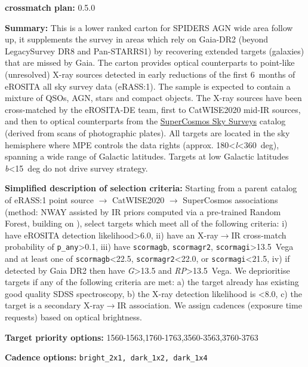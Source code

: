 \noindent\textbf{crossmatch plan:} 0.5.0

\noindent\textbf{Summary:} This is a lower ranked carton for SPIDERS AGN wide
area follow up, it supplements the survey in areas which rely on
Gaia-DR2 (beyond LegacySurvey DR8 and Pan-STARRS1) by recovering
extended targets (galaxies) that are missed by Gaia. The carton provides
optical counterparts to point-like (unresolved) X-ray sources detected
in early reductions of the first 6~months of eROSITA all sky survey data
(eRASS:1). The sample is expected to contain a mixture of QSOs, AGN,
stars and compact objects. The X-ray sources have been cross-matched by
the eROSITA-DE team, first to
CatWISE2020 \citep{Marocco2021}
mid-IR sources, and then to optical counterparts from the
\href{http://www-wfau.roe.ac.uk/sss/intro.html}{SuperCosmos Sky Surveys}
catalog (derived from scans of photographic plates). All targets are
located in the sky hemisphere where MPE controls the data rights
(approx. 180\textless{}\emph{l}\textless360~deg), spanning a wide range
of Galactic latitudes. Targets at low Galactic latitudes
\textbar{}\emph{b}\textbar\textless15~deg do not drive survey strategy.

\noindent\textbf{Simplified description of selection criteria:} Starting from a
parent catalog of eRASS:1 point source $\rightarrow$ CatWISE2020 $\rightarrow$ SuperCosmos
associations (method: NWAY assisted by IR priors computed via a
pre-trained Random Forest, building on
\citealt{Salvato2022}), select targets which meet all of the following criteria:
i) have eROSITA detection likelihood\textgreater6.0, ii) have an
X-ray$\rightarrow$IR cross-match probability of \texttt{p\_any}\textgreater0.1, iii)
have \texttt{scormagb}, \texttt{scormagr2},
\texttt{scormagi}\textgreater13.5~Vega and at least one of
\texttt{scormagb}\textless22.5, \texttt{scormagr2}\textless22.0, or
\texttt{scormagi}\textless21.5, iv) if detected by Gaia DR2 then have
\emph{G}\textgreater13.5 and \emph{RP}\textgreater13.5~Vega. We
deprioritise targets if any of the following criteria are met: a) the
target already has existing good quality SDSS spectroscopy, b) the X-ray
detection likelihood is \textless8.0, c) the target is a secondary
X-ray$\rightarrow$IR association. We assign cadences (exposure time requests) based
on optical brightness.


\noindent\textbf{Target priority options:}
1560-1563,1760-1763,3560-3563,3760-3763

\noindent\textbf{Cadence options:} \texttt{bright\_2x1,\ dark\_1x2,\ dark\_1x4}

